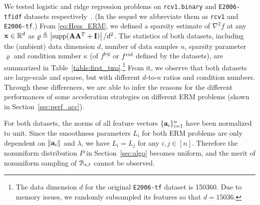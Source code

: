 \documentclass[10pt,twocolumn,journal]{IEEEtran}
\newcommand{\rid}{{\rm rid}}
\begin{document}
We tested logistic and ridge regression problems on {\tt rcv1.binary} and {\tt E2006-tfidf} datasets respectively~\cite{Chang_11}. (In the sequel we abbreviate them as {\tt rcv1} and {\tt E2006-tf}.) %
From \eqref{eq:Hess_ERM}, we defined a sparsity estimate of $\nabla^2 f$ at any $\mathbf{x}\in\mathbb{R}^d$ as $\varrho\triangleq \left\lvert\operatorname{supp}(\mathbf{A}\mathbf{A}^T+\mathbf{I})\right\rvert/d^2$. 
The statistics of both datasets, including the (ambient) data dimension $d$, number of data samples $n$, sparsity parameter $\varrho$ and condition number $\kappa$ (of $f^{\log}$ or $f^{\rid}$ defined by the datasets), are summarized in Table~\ref{table:first_two}.\footnote{The data dimension $d$ for the original {\tt E2006-tf} dataset is 150360. Due to memory issues, we randomly subsampled its features so that $d = 15036$.} From it, we observe that both datasets are large-scale and sparse, but with different $d$-to-$n$ ratios and condition numbers. Through these differences, we are able to infer the reasons for the different performances of some acceleration strategies on different ERM problems (shown in Section~\ref{sec:perf_acc}).

For both datasets, the norms of all feature vectors $\{\mathbf{a}_i\}_{i=1}^n$ have been normalized to unit. Since the smoothness parameters $L_i$ for both ERM problems are only  dependent on $\left\Vert\mathbf{a}_i\right\Vert$ and $\lambda$, we have $L_i=L_j$ for any $i,j\in[n]$. Therefore the nonuniform distribution $P$ in Section~\ref{sec:algo} becomes uniform, and the merit of nonuniform sampling of $\mathcal{B}_{s,t}$ cannot be observed.
 
\end{document}
